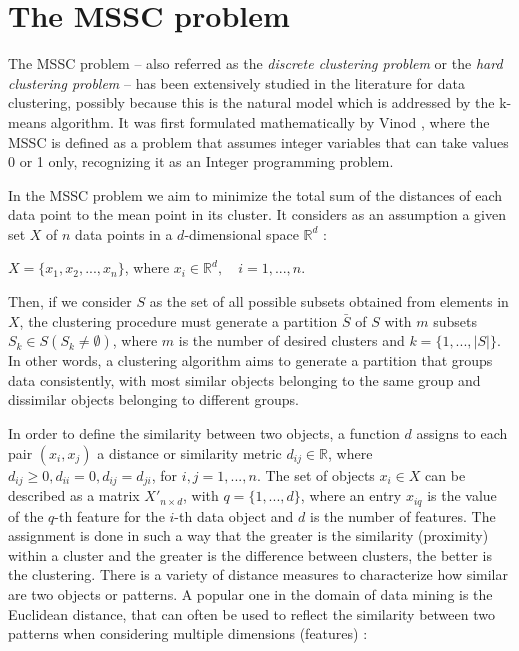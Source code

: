 \section{The MSSC problem}
The MSSC problem -- also referred as the \textit{discrete clustering problem} or the \textit{hard clustering problem} -- has been extensively studied in the literature for data clustering, possibly because this is the natural model which is addressed by the k-means algorithm. It was first formulated mathematically by Vinod \cite{Vinod1969}, where the MSSC is defined as a problem that assumes integer variables that can take values 0 or 1 only, recognizing it as an Integer programming problem.

In the MSSC problem we aim to minimize the total sum of the distances of each data point to the mean point in its cluster. It considers as an assumption a given set $X$ of $n$ data points in a $d$-dimensional space $\mathbb{R}^d$ \cite{Bagirov2006}:

\begin{center}%
$X = \{x_1, x_2, ..., x_n\}$, where $x_i \in \mathbb{R}^d, \quad i = 1, ..., n.$
\end{center}

Then, if we consider $S$ as the set of all possible subsets obtained from elements in $X$, the clustering procedure must generate a partition $\bar{S}$ of $S$ with $m$ subsets $S_k \in S (S_k \neq \emptyset)$, where $m$ is the number of desired clusters and $k = \{1,...,\left | S \right |\}$. In other words, a clustering algorithm aims to generate a partition that groups data consistently, with most similar objects belonging to the same group and dissimilar objects belonging to different groups.

In order to define the similarity between two objects, a function $d$ assigns to each pair $(x_i, x_j)$ a distance or similarity metric $d_{ij} \in \mathbb{R}$, where $d_{ij} \geq 0, d_{ii} = 0, d_{ij} = d_{ji}$, for $i, j = 1, ... ,n$. The set of objects $x_i \in X$ can be described as a matrix $X'_{n \times d}$, with $q = \{1,...,d\}$, where an entry $x_{iq}$ is the value of the $q$-th feature for the $i$-th data object and $d$ is the number of features. The assignment is done in such a way that the greater is the similarity (proximity) within a cluster and the greater is the difference between clusters, the better is the clustering. There is a variety of distance measures to characterize how similar are two objects or patterns. A popular one in the domain of data mining is the Euclidean distance, that can often be used to reflect the similarity between two patterns when considering multiple dimensions (features) \cite{Jain1999}:


